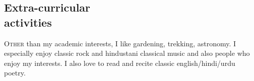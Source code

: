 \documentclass[margin,line]{res}
\begin{document}
\begin{resume}
\section{\sc Extra-curricular \\ activities}
\lettrine[lines=2]{O}{ther} than my academic interests, I like gardening, trekking, astronomy. I especially enjoy classic rock and hindustani classical music and also people who enjoy my interests. I also love to read and recite classic english/hindi/urdu poetry.  





\end{resume}
\end{document}
